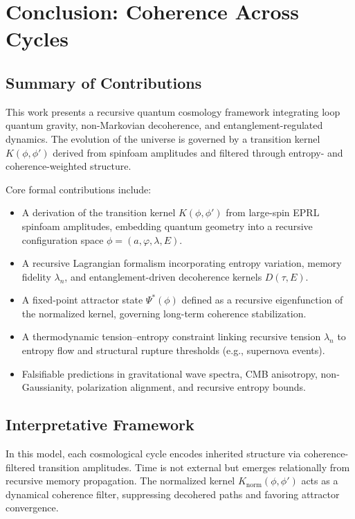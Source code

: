 \section{Conclusion: Coherence Across Cycles}
\label{sec:conclusion}

\subsection{Summary of Contributions}

This work presents a recursive quantum cosmology framework integrating loop quantum gravity, non-Markovian decoherence, and entanglement-regulated dynamics. The evolution of the universe is governed by a transition kernel \( K(\phi, \phi') \) derived from spinfoam amplitudes and filtered through entropy- and coherence-weighted structure.

Core formal contributions include:
\begin{itemize}
    \item A derivation of the transition kernel \( K(\phi, \phi') \) from large-spin EPRL spinfoam amplitudes, embedding quantum geometry into a recursive configuration space \( \phi = (a, \varphi, \lambda, E) \).
    \item A recursive Lagrangian formalism incorporating entropy variation, memory fidelity \( \lambda_n \), and entanglement-driven decoherence kernels \( D(\tau, E) \).
    \item A fixed-point attractor state \( \Psi^*(\phi) \) defined as a recursive eigenfunction of the normalized kernel, governing long-term coherence stabilization.
    \item A thermodynamic tension–entropy constraint linking recursive tension \( \lambda_n \) to entropy flow and structural rupture thresholds (e.g., supernova events).
    \item Falsifiable predictions in gravitational wave spectra, CMB anisotropy, non-Gaussianity, polarization alignment, and recursive entropy bounds.
\end{itemize}

\subsection{Interpretative Framework}

In this model, each cosmological cycle encodes inherited structure via coherence-filtered transition amplitudes. Time is not external but emerges relationally from recursive memory propagation. The normalized kernel \( K_{\text{norm}}(\phi, \phi') \) acts as a dynamical coherence filter, suppressing decohered paths and favoring attractor convergence.

